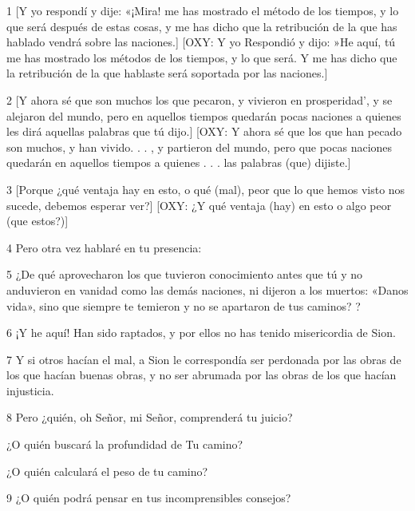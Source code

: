 \par 1 [Y yo respondí y dije: «¡Mira! me has mostrado el método de los tiempos, y lo que será después de estas cosas, y me has dicho que la retribución de la que has hablado vendrá sobre las naciones.] [OXY: Y yo Respondió y dijo: »He aquí, tú me has mostrado los métodos de los tiempos, y lo que será. Y me has dicho que la retribución de la que hablaste será soportada por las naciones.]

\par 2 [Y ahora sé que son muchos los que pecaron, y vivieron en prosperidad', y se alejaron del mundo, pero en aquellos tiempos quedarán pocas naciones a quienes les dirá aquellas palabras que tú dijo.] [OXY: Y ahora sé que los que han pecado son muchos, y han vivido. . . , y partieron del mundo, pero que pocas naciones quedarán en aquellos tiempos a quienes . . . las palabras (que) dijiste.]

\par 3 [Porque ¿qué ventaja hay en esto, o qué (mal), peor que lo que hemos visto nos sucede, debemos esperar ver?] [OXY: ¿Y qué ventaja (hay) en esto o algo peor (que estos?)]

\par 4 Pero otra vez hablaré en tu presencia:

\par 5 ¿De qué aprovecharon los que tuvieron conocimiento antes que tú y no anduvieron en vanidad como las demás naciones, ni dijeron a los muertos: «Danos vida», sino que siempre te temieron y no se apartaron de tus caminos? ?

\par 6 ¡Y he aquí! Han sido raptados, y por ellos no has tenido misericordia de Sion.

\par 7 Y si otros hacían el mal, a Sion le correspondía ser perdonada por las obras de los que hacían buenas obras, y no ser abrumada por las obras de los que hacían injusticia.

\par 8 Pero ¿quién, oh Señor, mi Señor, comprenderá tu juicio?

\par ¿O quién buscará la profundidad de Tu camino?

\par ¿O quién calculará el peso de tu camino?

\par 9 ¿O quién podrá pensar en tus incomprensibles consejos?

